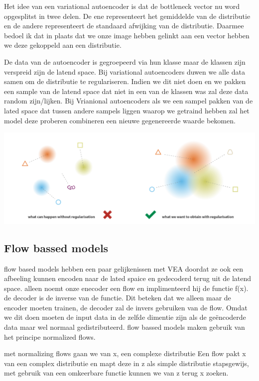 \documentclass[12pt]{article}
\begin{document}
\bigskip
Het idee van een variational autoencoder is dat de bottleneck vector nu word opgesplitst in twee delen.
De ene representeert het gemiddelde van de distributie en de andere representeert de standaard afwijking van de distributie.
Daarmee bedoel ik dat in plaats dat we onze image hebben gelinkt aan een vector hebben we deze gekoppeld aan een distributie.

\bigskip
De data van de autoencoder is gegroepeerd via hun klasse maar de klassen zijn verspreid zijn de latend space.
Bij variational autoencoders duwen we alle data samen om de distributie te  regulariseren.
Indien we dit niet doen en we pakken een sample van de latend space dat niet in een van de klassen was
zal deze data random zijn/lijken. Bij Vrianional autoencoders  als we een sampel pakken van de lated space
dat tussen andere sampels liggen waarop we getraind hebben zal het model deze proberen combineren een nieuwe
gegenereerde waarde bekomen.
\autocite{Weng2018}

\begin{center}
    \includegraphics{VAE.png}
\end{center}

\subsection{Flow bassed models}
flow based models hebben een paar gelijkenissen met VEA doordat ze ook een afbeeling kunnen encoden naar de lated spaice
en gedecoderd terug uit de latend space. alleen noemt onze enecoder een flow en implimenteerd hij de functie f(x).
de decoder is de inverse van de functie. Dit beteken dat we alleen maar de encoder moeten trainen, de decoder zal de
invers gebruiken van de flow. Omdat we dit doen moeten de input data in de zelfde dimentie zijn als de geëncoderde data
maar wel normaal gedistributeerd. flow bassed models maken gebruik van het principe normalized flows.

\bigskip
met normalizing flows gaan we van x, een complexe distributie 
Een flow pakt x van een complex distributie en mapt deze in z als simple distributie stapsgewijs, met gebruik van een omkeerbare functie
kunnen we van z terug x zoeken.
\end{document}
